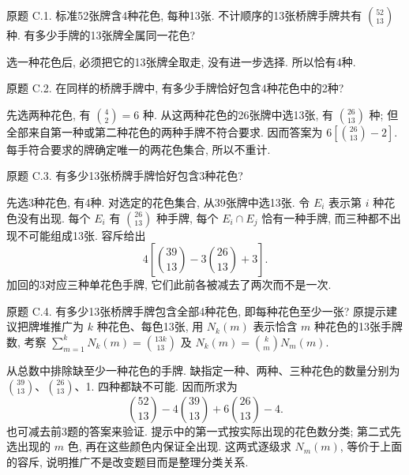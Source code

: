 \begin{exercise}\label{ps1-c1}
原题 C.1. 标准52张牌含4种花色, 每种13张. 不计顺序的13张桥牌手牌共有 $\binom{52}{13}$ 种. 有多少手牌的13张牌全属同一花色?
\end{exercise}
\begin{solution}
选一种花色后, 必须把它的13张牌全取走, 没有进一步选择. 所以恰有4种.
\end{solution}

\begin{exercise}\label{ps1-c2}
原题 C.2. 在同样的桥牌手牌中, 有多少手牌恰好包含4种花色中的2种?
\end{exercise}
\begin{solution}
先选两种花色, 有 $\binom42=6$ 种. 从这两种花色的26张牌中选13张, 有 $\binom{26}{13}$ 种; 但全部来自第一种或第二种花色的两种手牌不符合要求. 因而答案为 $6[\binom{26}{13}-2]$. 每手符合要求的牌确定唯一的两花色集合, 所以不重计.
\end{solution}

\begin{exercise}\label{ps1-c3}
原题 C.3. 有多少13张桥牌手牌恰好包含3种花色?
\end{exercise}
\begin{solution}
先选3种花色, 有4种. 对选定的花色集合, 从39张牌中选13张. 令 $E_i$ 表示第 $i$ 种花色没有出现. 每个 $E_i$ 有 $\binom{26}{13}$ 种手牌, 每个 $E_i\cap E_j$ 恰有一种手牌, 而三种都不出现不可能组成13张. 容斥给出
\[
4\left[\binom{39}{13}-3\binom{26}{13}+3\right].
\]
加回的3对应三种单花色手牌, 它们此前各被减去了两次而不是一次.
\end{solution}

\begin{exercise}\label{ps1-c4}
原题 C.4. 有多少13张桥牌手牌包含全部4种花色, 即每种花色至少一张? 原提示建议把牌堆推广为 $k$ 种花色、每色13张, 用 $N_k(m)$ 表示恰含 $m$ 种花色的13张手牌数, 考察 $\sum_{m=1}^kN_k(m)=\binom{13k}{13}$ 及 $N_k(m)=\binom kmN_m(m)$.
\end{exercise}
\begin{solution}
从总数中排除缺至少一种花色的手牌. 缺指定一种、两种、三种花色的数量分别为 $\binom{39}{13}$、$\binom{26}{13}$、1. 四种都缺不可能. 因而所求为
\[
\binom{52}{13}-4\binom{39}{13}+6\binom{26}{13}-4.
\]
也可减去前3题的答案来验证. 提示中的第一式按实际出现的花色数分类; 第二式先选出现的 $m$ 色, 再在这些颜色内保证全出现. 这两式逐级求 $N_m(m)$, 等价于上面的容斥, 说明推广不是改变题目而是整理分类关系.
\end{solution}

